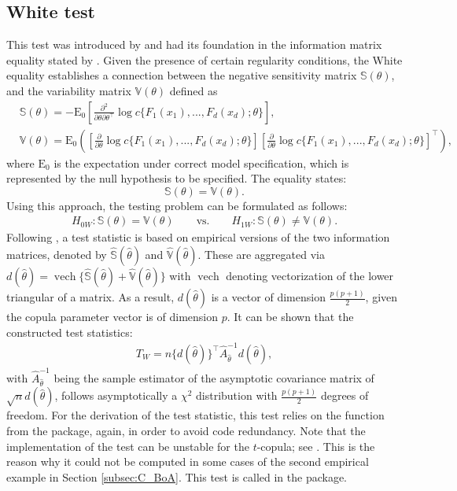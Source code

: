 \subsection{White test}\label{subsec:gof_White}
This test was introduced by \citet{huang_goodness--fit_2014} and had its foundation in the information matrix equality stated by \citet{white1982maximum}. Given the presence of certain regularity conditions, the White equality establishes a connection between the negative sensitivity matrix $\mathbb{S}(\theta)$, and the variability matrix $\mathbb{V}(\theta)$ defined as
\begin{align*}
    &\mathbb{S}(\theta) = -\operatorname{E_0} \left[\frac{\partial^2}{\partial \theta \partial \theta^{\top}}\log{c\{F_1(x_1),...,F_d(x_d);\theta\}} \right],
    \\
    &\mathbb{V}(\theta) = \operatorname{E_0} \left(\left[\frac{\partial}{\partial \theta}\log c\{F_1(x_1),...,F_d(x_d);\theta\}\right]\left[\frac{\partial}{\partial \theta}\log c\{F_1(x_1),...,F_d(x_d);\theta\}\right]^{\top} \right),
\end{align*}
where $\operatorname{E_0}$ is the expectation under correct model specification, which is represented by the null hypothesis to be specified.
The equality states:
$$\mathbb{S}(\theta) = \mathbb{V}(\theta).$$
Using this approach, the testing problem can be formulated as follows:
\begin{align*}
H_{0W}: \mathbb{S}(\theta) = \mathbb{V}(\theta)\qquad \text{vs.} \qquad H_{1W}:\mathbb{S}(\theta) \not= \mathbb{V}(\theta).
\end{align*}
Following \citet{schepsmeier2015efficient}, a test statistic is based on empirical versions of the two information matrices, denoted by $\widehat{\mathbb{S}}(\hat{\theta})$ and $\widehat{\mathbb{V}}(\hat{\theta})$. These are aggregated via ${d(\hat{\theta}) = \operatorname{vech}\{\widehat{\mathbb{S}}(\hat{\theta}) + \widehat{\mathbb{V}}(\hat{\theta})\}}$ with $\operatorname{vech}$ denoting vectorization of the lower triangular of a matrix. As a result, $d(\hat{\theta})$ is a vector of dimension $\frac{p(p+1)}{2}$, given the copula parameter vector is of dimension $p$. It can be shown that the constructed test statistics:
\begin{align*}
T_{W} = n \{ d(\hat{\theta})\}^{\top} \hat{A}_{\hat{\theta}}^{-1} d(\hat{\theta}),
\end{align*}
with $\hat{A}_{\hat{\theta}}^{-1}$ being the sample estimator of the asymptotic covariance matrix of $\sqrt{n} d(\hat{\theta})$, follows asymptotically a $\chi^2$ distribution with $\frac{p(p+1)}{2}$ degrees of freedom. \mycolor For the derivation of the test statistic, this test relies on the function  from the  package, again, in order to avoid code redundancy. \bk Note that the implementation of the test can be unstable for the $t$-copula; see \citet{schepsmeier2018package}. This is the reason why it could not be computed in some cases of the second empirical example in Section \ref{subsec:C_BoA}. \mycolor This test is called  in the package. \bk

